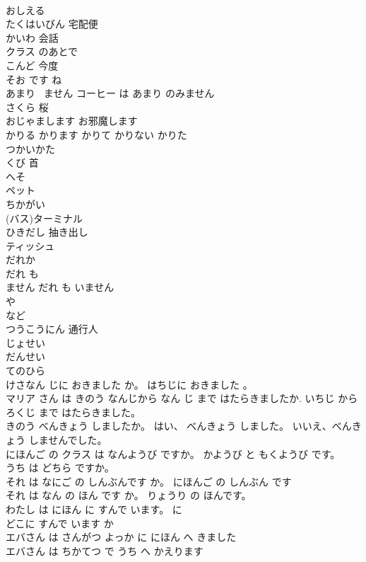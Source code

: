 \documentclass[8pt]{extreport}
\begin{document}
\begin{CJK}{UTF8}{min}
\\	おしえる	
\\	たくはいびん	宅配便
\\	かいわ	会話
\\	クラス のあとで	
\\	こんど	今度
\\	そお です ね	
\\	あまり ~ません コーヒー は あまり のみません	
\\	さくら	桜
\\	おじゃまします	お邪魔します
\\	かりる	かります	かりて	かりない	かりた	
\\	つかいかた	
\\	くび	首
\\	へそ	
\\	ペット	
\\	ちかがい	
\\	(バス)ターミナル	
\\	ひきだし	抽き出し
\\	ティッシュ	
\\	だれか	
\\	だれ も 
\\	ません だれ も いません	
\\	や 
\\	など	
\\	つうこうにん	通行人
\\	じょせい	
\\	だんせい	
\\	てのひら	
\\	けさなん じに おきました か。 はちじに おきました 。	
\\	マリア さん は きのう なんじから なん じ まで はたらきましたか. いちじ から ろくじ まで はたらきました。	
\\	きのう べんきょう しましたか。 はい、 べんきょう しました。 いいえ、べんきょう しませんでした。	
\\	にほんご の クラス は なんようび ですか。 かようび と もくようび です。	
\\	うち は どちら ですか。	
\\	それ は なにご の しんぶんです か。 にほんご の しんぶん です	
\\	それ は なん の ほん です か。 りょうり の ほんです。	
\\	わたし は にほん に すんで います。	に 
\\	どこに すんで います か	
\\	エバさん は さんがつ よっか に にほん へ きました	
\\	エバさん は ちかてつ で うち へ かえります	

\end{CJK}
\end{document}
